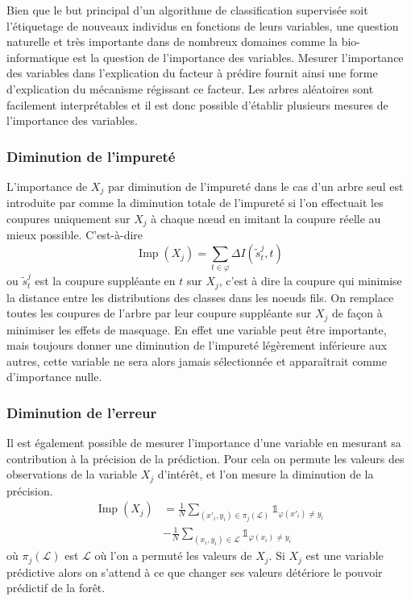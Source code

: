 Bien que le but principal d'un algorithme de classification supervisée soit l'étiquetage de nouveaux individus en fonctions de leurs variables, une question naturelle et très importante dans de nombreux domaines comme la bio-informatique est la question de l'importance des variables. Mesurer l'importance des variables dans l'explication du facteur à prédire fournit ainsi une forme d'explication du mécanisme régissant ce facteur. Les arbres aléatoires sont facilement interprétables et il est donc possible d'établir plusieurs mesures de l'importance des variables.

\subsubsection{Diminution de l'impureté}

L'importance de $X_j$ par diminution de l'impureté dans le cas d'un arbre seul est introduite par \citet{Breiman1984a} comme la diminution totale de l'impureté si l'on effectuait les coupures uniquement sur $X_j$ à chaque nœud en imitant la coupure réelle au mieux possible.
C'est-à-dire
\begin{equation*}
    \operatorname{Imp}(X_j) = \sum_{t \in \varphi} \Delta I(\tilde{s}_t^j,t)
\end{equation*}
ou $\tilde{s}_t^j$ est la coupure suppléante en $t$ sur $X_j$, c'est à dire la coupure qui minimise la distance entre les distributions des classes dans les noeuds fils. On remplace toutes les coupures de l'arbre par leur coupure suppléante sur $X_j$ de façon à minimiser les effets de masquage. En effet une variable peut être importante, mais toujours donner une diminution de l'impureté légèrement inférieure aux autres, cette variable ne sera alors jamais sélectionnée et apparaîtrait comme d'importance nulle.


\subsubsection{Diminution de l'erreur}

Il est également possible de mesurer l'importance d'une variable en mesurant sa contribution à la précision de la prédiction. Pour cela on permute les valeurs des observations de la variable $X_j$ d'intérêt, et l'on mesure la diminution de la précision.
\begin{align*}
    \operatorname{Imp}(X_j) &= \frac{1}{N} \sum_{(x'_i,y_i) \in \pi_j(\mathcal{L})} \mathds{1}_{\varphi(x'_i) \neq y_i} \\
    &- \frac{1}{N} \sum_{(x_i,y_i) \in \mathcal{L}} \mathds{1}_{\varphi(x_i) \neq y_i}
\end{align*}
où $\pi_j(\mathcal{L})$ est $\mathcal{L}$ où l'on a permuté les valeurs de $X_j$.
Si $X_j$ est une variable prédictive alors on s'attend à ce que changer ses valeurs détériore le pouvoir prédictif de la forêt.

